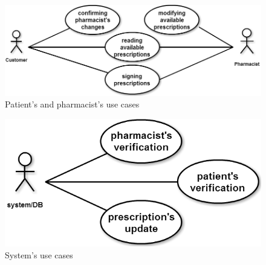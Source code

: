 \begin{figure}[h]
    \centering
    \includegraphics[width=0.75\textheight]{use-case-2.png}
    \caption{Patient's and pharmacist's use cases}
    \label{fig:usecase1}
\end{figure} 

\begin{figure}[h]
    \centering
    \includegraphics[width=0.45\textheight]{use-case-1.png}
    \caption{System's use cases}
    \label{fig:usecase}
\end{figure} 


\newpage
\section{}

